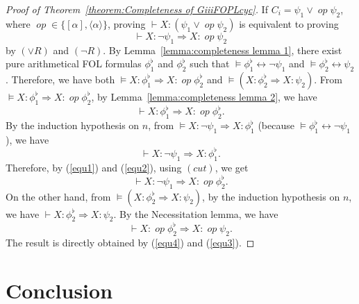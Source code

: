 \documentclass[manuscript,screen]{acmart}
\newcommand{\la}[0]{\langle}
\newcommand{\ra}[0]{\rangle}
\DeclareMathOperator{\op}{\mathit{op}}
\begin{document}
\begin{proof}[Proof of Theorem~\ref{theorem:Completeness of GiiiFOPLcyc}]
    If $C_i = \psi_1\vee \op \psi_2$, where $\op\in \{[\alpha], \la\alpha\ra\}$,  
proving $\vdash X : (\psi_1\vee \op \psi_2)$ is equivalent to proving $$\vdash X : \neg \psi_1\Rightarrow X : \op \psi_2$$ by $(\vee R)$ and $(\neg R)$. 
By Lemma~\ref{lemma:completeness lemma 1}, there exist pure arithmetical FOL formulas 
    $\phi^\flat_1$ and $\phi^\flat_2$ such that $\models \phi^\flat_1 \leftrightarrow \neg\psi_1$ and $\models \phi^\flat_2\leftrightarrow \psi_2$. 
    Therefore, we have both $\models X : \phi^\flat_1\Rightarrow X : \op\phi^\flat_2$ and $\models (X: \phi^\flat_2\Rightarrow X : \psi_2)$. 
    From $\models X : \phi^\flat_1\Rightarrow X : \op\phi^\flat_2$, by Lemma~\ref{lemma:completeness lemma 2}, we have 
    \begin{equation}
    \label{equ1}
    \vdash X : \phi^\flat_1\Rightarrow X : \op\phi^\flat_2.
    \end{equation}
By the induction hypothesis on $n$, from $\models X : \neg\psi_1\Rightarrow X : \phi^\flat_1$ (because $\models \phi^\flat_1 \leftrightarrow \neg\psi_1$), we have 
    \begin{equation}
        \label{equ2}
        \vdash X : \neg\psi_1\Rightarrow X : \phi^\flat_1.  
    \end{equation}
    Therefore, by (\ref{equ1}) and (\ref{equ2}), using $(cut)$, we get
    \begin{equation}
    \label{equ4}
    \vdash X : \neg\psi_1\Rightarrow X : \op\phi^\flat_2. 
    \end{equation}
    On the other hand, 
    from $\models (X: \phi^\flat_2\Rightarrow X : \psi_2)$, 
by the induction hypothesis on $n$, we have $\vdash X: \phi^\flat_2\Rightarrow X : \psi_2$. 
By the Necessitation lemma, we have 
    \begin{equation}
        \label{equ3}
    \vdash  X : \op\phi^\flat_2\Rightarrow X : \op\psi_2.
    \end{equation}
    The result is directly obtained by (\ref{equ4}) and (\ref{equ3}).  
    
\end{proof}

\section{Conclusion}
\label{section:Conclusion}
\end{document}
